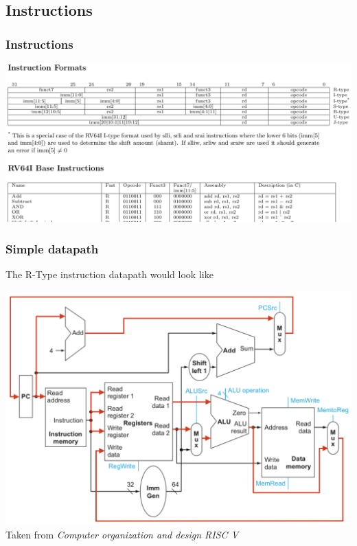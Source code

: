 \documentclass{beamer}
\begin{document}
    \begin{frame}
        \subsection{Instructions}
        \frametitle{Instructions}
        \centering
        \vspace{-0.5cm}
        \includegraphics[scale=0.28]{"Pictures and plots/instructions"} \\     
    \end{frame}

    \begin{frame}
        \frametitle{Simple datapath}
        \centering
        \vspace{-0.5cm}
        The R-Type instruction datapath would look like
        
        \includegraphics[scale=0.33]{"Pictures and plots/rformatpath"} \\
        \scriptsize{Taken from \textit{Computer organization and design RISC V}}
        
    \end{frame}
\end{document}
